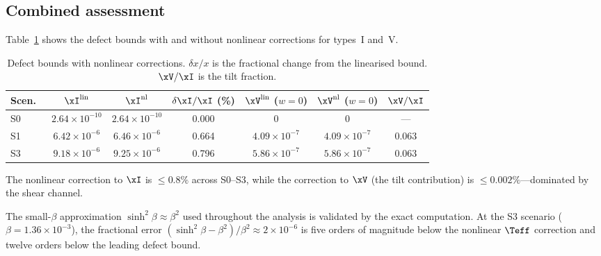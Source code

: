 \subsection{Combined assessment}\label{sec:combined}

Table~\ref{tab:defect-prop} shows the defect bounds with and
without nonlinear corrections for types~I and~V.

\begin{table}[h]
\caption{Defect bounds with nonlinear corrections.
$\delta x/x$ is the fractional change from the linearised bound.
$\xV/\xI$ is the tilt fraction.}
\label{tab:defect-prop}
\centering\footnotesize\setlength{\tabcolsep}{3.5pt}
\begin{tabular}{lcccccc}
\toprule
Scen.\ & $\xI^{\mathrm{lin}}$ & $\xI^{\mathrm{nl}}$
  & $\delta\xI/\xI$ (\%)
  & $\xV^{\mathrm{lin}}$ ($w{=}0$)
  & $\xV^{\mathrm{nl}}$ ($w{=}0$)
  & $\xV/\xI$ \\
\midrule
S0  & $2.64\times10^{-10}$ & $2.64\times10^{-10}$ & 0.000
    & 0 & 0 & --- \\
S1  & $6.42\times10^{-6}$  & $6.46\times10^{-6}$  & 0.664
    & $4.09\times10^{-7}$ & $4.09\times10^{-7}$ & 0.063 \\
S3  & $9.18\times10^{-6}$  & $9.25\times10^{-6}$  & 0.796
    & $5.86\times10^{-7}$ & $5.86\times10^{-7}$ & 0.063 \\
\bottomrule
\end{tabular}
\end{table}

The nonlinear correction to $\xI$ is $\leq 0.8\%$ across
S0--S3, while the correction to $\xV$ (the tilt
contribution) is $\leq 0.002\%$---dominated by the shear
channel.

The small-$\beta$ approximation
$\sinh^2\!\beta \approx \beta^2$ used throughout the analysis
is validated by the exact computation.  At the S3 scenario
($\beta = 1.36 \times 10^{-3}$), the fractional error
$(\sinh^2\!\beta - \beta^2)/\beta^2 \approx 2 \times 10^{-6}$
is five orders of magnitude below the nonlinear $\Teff$
correction and twelve orders below the leading defect bound.



